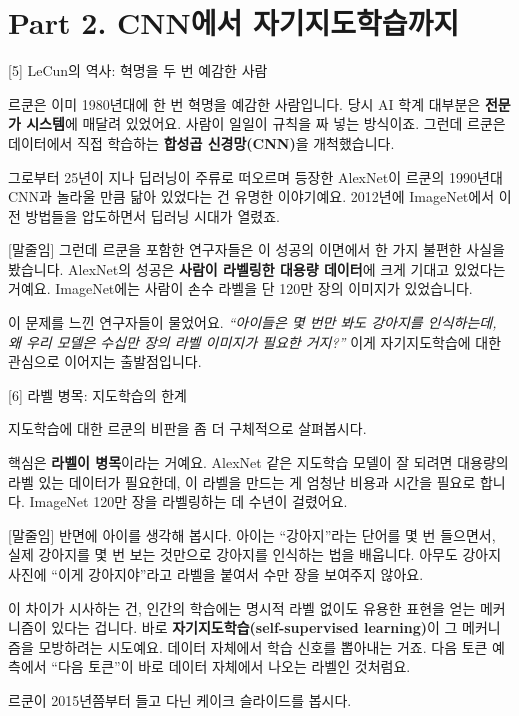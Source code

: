 \documentclass[aspectratio=169,10pt]{beamer}
\newenvironment{script}{%
  \footnotesize
  \setlength{\parskip}{0.5em}
  \setlength{\parindent}{0pt}
}{}
\begin{document}
\section{Part 2. CNN에서 자기지도학습까지}

\begin{frame}{[5] LeCun의 역사: 혁명을 두 번 예감한 사람}
\begin{script}
르쿤은 이미 1980년대에 한 번 혁명을 예감한 사람입니다. 당시 AI 학계 대부분은 \textbf{전문가 시스템}에 매달려 있었어요. 사람이 일일이 규칙을 짜 넣는 방식이죠. 그런데 르쿤은 데이터에서 직접 학습하는 \textbf{합성곱 신경망(CNN)}을 개척했습니다.

그로부터 25년이 지나 딥러닝이 주류로 떠오르며 등장한 AlexNet이 르쿤의 1990년대 CNN과 놀라울 만큼 닮아 있었다는 건 유명한 이야기예요. 2012년에 ImageNet에서 이전 방법들을 압도하면서 딥러닝 시대가 열렸죠.

[말줄임] 그런데 르쿤을 포함한 연구자들은 이 성공의 이면에서 한 가지 불편한 사실을 봤습니다. AlexNet의 성공은 \textbf{사람이 라벨링한 대용량 데이터}에 크게 기대고 있었다는 거예요. ImageNet에는 사람이 손수 라벨을 단 120만 장의 이미지가 있었습니다.

이 문제를 느낀 연구자들이 물었어요. \textit{``아이들은 몇 번만 봐도 강아지를 인식하는데, 왜 우리 모델은 수십만 장의 라벨 이미지가 필요한 거지?''} 이게 자기지도학습에 대한 관심으로 이어지는 출발점입니다.
\end{script}
\end{frame}

\begin{frame}{[6] 라벨 병목: 지도학습의 한계}
\begin{script}
지도학습에 대한 르쿤의 비판을 좀 더 구체적으로 살펴봅시다.

핵심은 \textbf{라벨이 병목}이라는 거예요. AlexNet 같은 지도학습 모델이 잘 되려면 대용량의 라벨 있는 데이터가 필요한데, 이 라벨을 만드는 게 엄청난 비용과 시간을 필요로 합니다. ImageNet 120만 장을 라벨링하는 데 수년이 걸렸어요.

[말줄임] 반면에 아이를 생각해 봅시다. 아이는 ``강아지''라는 단어를 몇 번 들으면서, 실제 강아지를 몇 번 보는 것만으로 강아지를 인식하는 법을 배웁니다. 아무도 강아지 사진에 ``이게 강아지야''라고 라벨을 붙여서 수만 장을 보여주지 않아요.

이 차이가 시사하는 건, 인간의 학습에는 명시적 라벨 없이도 유용한 표현을 얻는 메커니즘이 있다는 겁니다. 바로 \textbf{자기지도학습(self-supervised learning)}이 그 메커니즘을 모방하려는 시도예요. 데이터 자체에서 학습 신호를 뽑아내는 거죠. 다음 토큰 예측에서 ``다음 토큰''이 바로 데이터 자체에서 나오는 라벨인 것처럼요.

르쿤이 2015년쯤부터 들고 다닌 케이크 슬라이드를 봅시다.
\end{script}
\end{frame}
\end{document}
